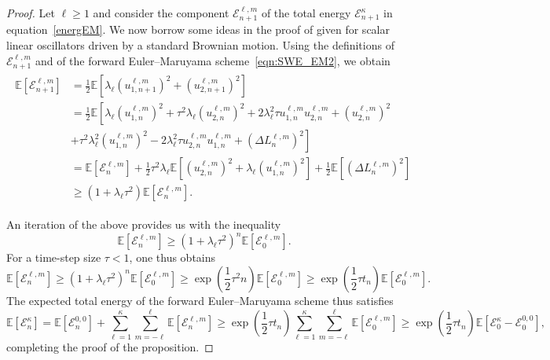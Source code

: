 \documentclass[11pt]{amsart}
\newcommand{\E}{{\mathbb E}}
\newcommand{\cE}{\mathcal E}
\begin{document}
\begin{proof}
Let $\ell\geq1$ and consider the component $\mathcal E_{n+1}^{\ell,m}$ of the total energy $\mathcal{E}^\kappa_{n+1}$ in equation~\eqref{energEM}.
We now borrow some ideas in the proof of \cite[Theorem~3]{MR2083326} given for scalar linear oscillators driven by a standard Brownian motion.
Using the definitions of $\mathcal E_{n+1}^{\ell,m}$ and of the forward Euler--Maruyama scheme~\eqref{eqn:SWE_EM2}, we obtain
\begin{align}\label{energy0EM}
    \begin{split}
    \E\left[\cE_{n+1}^{\ell,m}\right] &=\frac{1}{2}\E\left[\lambda_\ell\left(u_{1,n+1}^{\ell, m}\right)^2 + \left(u_{2,n+1}^{\ell, m}\right)^2\right]\\
    &= \frac{1}{2} \E\left[\lambda_\ell \left(u_{1,n}^{\ell, m}\right)^2 + \tau^2 \lambda_\ell \left(u_{2,n}^{\ell, m}\right)^2
    + 2 \lambda_\ell^2\tau u_{1,n}^{\ell, m}u_{2,n}^{\ell, m} + \left(u_{2,n}^{\ell, m}\right)^2\right.\\
    & \left.+ \tau^2 \lambda_\ell^2\left(u_{1,n}^{\ell, m}\right)^2 - 2 \lambda_\ell^2 \tau u_{2,n}^{\ell, m}u_{1,n}^{\ell, m} + \left(\Delta L^{\ell, m}_n\right)^2\right]\\
    &=\E\left[\cE_{n}^{\ell,m}\right] +  \frac12\tau^2 \lambda_\ell \E\left[\left(u_{2,n}^{\ell, m}\right)^2 + \lambda_\ell\left(u_{1,n}^{\ell, m}\right)^2\right]+\frac{1}{2}\E\left[\left(\Delta L^{\ell, m}_n\right)^2\right]\\
    & \geq \left(1 + \lambda_\ell\tau^2\right)\E\left[\cE_{n}^{\ell,m}\right].
    \end{split}
\end{align}

An iteration of the above provides us with the inequality
\begin{equation*}
\E\left[\cE_{n}^{\ell,m}\right] \geq (1 + \lambda_\ell\tau^2)^n\E\left[\cE_{0}^{\ell,m}\right].
\end{equation*}
For a time-step size $\tau<1$, one thus obtains
$$
\E\left[\cE_{n}^{\ell,m}\right] \geq (1 + \lambda_\ell\tau^2)^n\E\left[\cE_{0}^{\ell,m}\right]\geq \exp\left(\frac12\tau^2 n\right)\E\left[\cE_{0}^{\ell,m}\right]
\geq \exp\left(\frac12\tau t_n\right)\E\left[\cE_{0}^{\ell,m}\right].
$$
The expected total energy of the forward Euler--Maruyama scheme thus satisfies
$$
\E\left[\mathcal{E}^\kappa_n\right]=\E\left[\cE_{n}^{0,0}\right]+\sum_{\ell=1}^\kappa\sum_{m=-\ell}^{\ell}\E\left[\cE_{n}^{\ell,m}\right]\geq
\exp\left(\frac12\tau t_n\right)\sum_{\ell=1}^\kappa\sum_{m=-\ell}^{\ell}\E\left[\cE_{0}^{\ell,m}\right]
\geq \exp\left(\frac12\tau t_n\right)\E\left[\mathcal{E}^\kappa_0 - \mathcal{E}_0^{0,0}\right],
$$
completing the proof of the proposition.
\end{proof}
\end{document}

